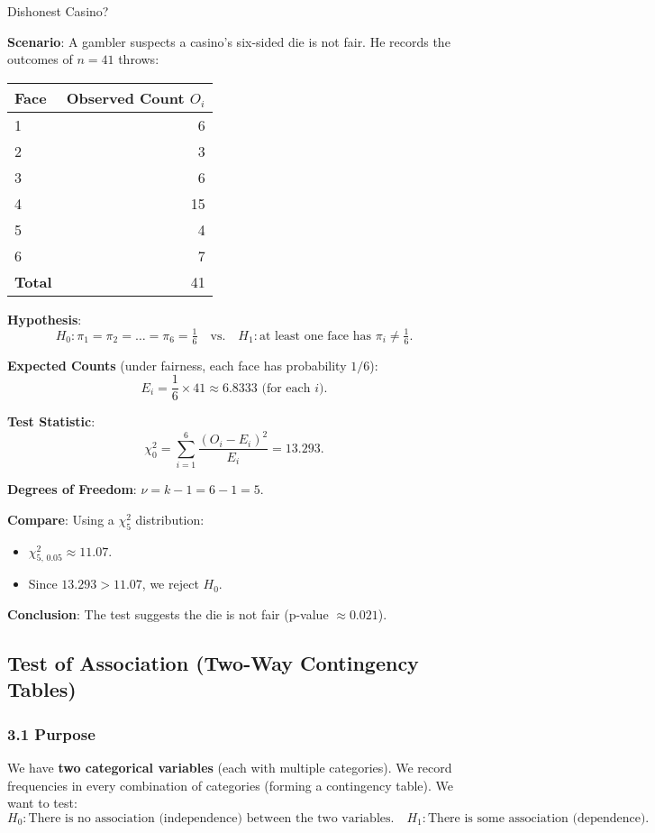 \documentclass[10pt]{extarticle}
\begin{document}
\begin{examplebox}{Dishonest Casino?}{}

\textbf{Scenario}: A gambler suspects a casino's six-sided die is not fair. He records the outcomes of $n=41$ throws:

\begin{center}
\begin{tabular}{lr}
\toprule
Face & Observed Count $O_i$ \\
\midrule
1 & 6 \\
2 & 3 \\
3 & 6 \\
4 & 15 \\
5 & 4 \\
6 & 7 \\
\midrule
\textbf{Total} & 41 \\
\bottomrule
\end{tabular}
\end{center}

\textbf{Hypothesis}:
\[
H_0: 
\pi_1 = \pi_2 = \dots = \pi_6 = \tfrac{1}{6}
\quad
\text{vs.}
\quad
H_1: 
\text{at least one face has }\pi_i \neq \tfrac{1}{6}.
\]

\textbf{Expected Counts} (under fairness, each face has probability $1/6$):
\[
E_i = \frac{1}{6} \times 41 \approx 6.8333 \text{ (for each }i).
\]

\textbf{Test Statistic}:
\[
\chi^2_0 
= \sum_{i=1}^{6} \frac{(O_i - E_i)^2}{E_i}
= 13.293.
\]

\textbf{Degrees of Freedom}: $\nu = k-1 = 6 - 1 = 5$.

\textbf{Compare}: Using a $\chi^2_5$ distribution:
\begin{itemize}
    \item $\chi^2_{5,\,0.05} \approx 11.07$.
    \item Since $13.293 > 11.07$, we reject $H_0$.
\end{itemize}

\textbf{Conclusion}: The test suggests the die is not fair (p-value $\approx 0.021$).
\end{examplebox}

\subsection{Test of Association (Two-Way Contingency Tables)}

\subsubsection{3.1 Purpose}
We have \textbf{two categorical variables} (each with multiple categories). We record frequencies in every combination of categories (forming a contingency table). We want to test:
$$
H_0 : \text{There is no association (independence) between the two variables.}
\quad
H_1 : \text{There is some association (dependence).}
$$
\end{document}
